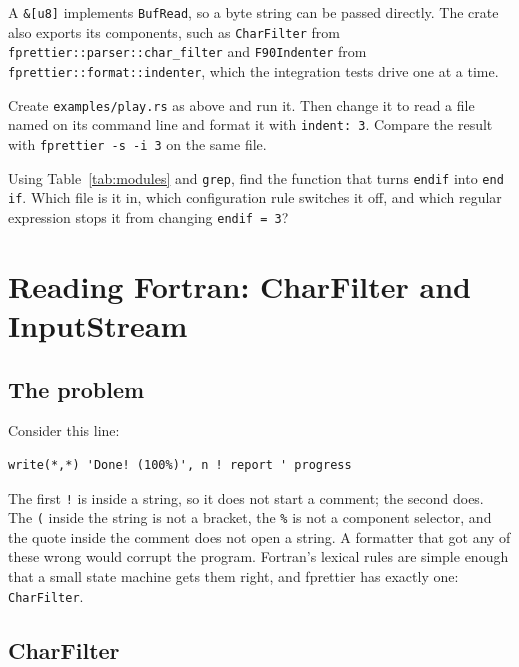 \documentclass[11pt,a4paper,openany]{book}
\newcommand{\code}[1]{\texttt{\small #1}}
\newcommand{\file}[1]{\texttt{\small\color{accent}#1}}
\newcounter{exercise}[chapter]
\begin{document}
A \code{\&[u8]} implements \code{BufRead}, so a byte string can be passed
directly. The crate also exports its components, such as \code{CharFilter}
from \code{fprettier::parser::char\_filter} and \code{F90Indenter} from
\code{fprettier::format::indenter}, which the integration tests drive one at a
time.

\begin{exercise}[Orientation]
Create \file{examples/play.rs} as above and run it. Then change it to read a
file named on its command line and format it with \code{indent: 3}. Compare the
result with \code{fprettier -s -i 3} on the same file.
\end{exercise}

\begin{exercise}
Using Table~\ref{tab:modules} and \code{grep}, find the function that turns
\code{endif} into \code{end if}. Which file is it in, which configuration rule
switches it off, and which regular expression stops it from changing
\code{endif = 3}?
\end{exercise}

\chapter{Reading Fortran: CharFilter and InputStream}\label{ch:reading}

\section{The problem}

Consider this line:

\begin{lstlisting}[style=fortran]
write(*,*) 'Done! (100%)', n ! report ' progress
\end{lstlisting}

The first \code{!} is inside a string, so it does not start a comment; the
second does. The \code{(} inside the string is not a bracket, the \code{\%} is not a
component selector, and the quote inside the comment does not open a string. A
formatter that got any of these wrong would corrupt the program. Fortran's
lexical rules are simple enough that a small state machine gets them right,
and fprettier has exactly one: \code{CharFilter}.

\section{CharFilter}
\end{document}
